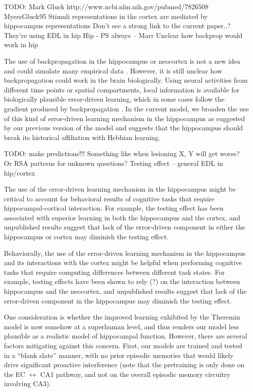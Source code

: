 \documentclass[11pt,twoside]{article}
\newif\myifpdf
\begin{document}
TODO: Mark Gluck  http://www.ncbi.nlm.nih.gov/pubmed/7826508  MyersGluck95
Stimuli representations in the cortex are mediated by hippocampus representations
Don't see a strong link to the current paper..?
They're using EDL in hip
Hip - PS always -- Marr
Unclear how backprop would work in hip

The use of backpropagation in the hippocampus or neocortex is not a new idea and could simulate many empirical data \citep{MyersGluck95}.  However, it is still unclear how backpropagation could work in the brain biologically.  Using neural activities from different time points or spatial compartments, local information is available for biologically plausible error-driven learning, which in some cases follow the gradient produced by backpropagation \citep{LillicrapSantoroMarrisEtAl20}.  In the current model, we broaden the use of this kind of error-driven learning mechanism in the hippocampus as suggested by our previous version of the model \citep{KetzMorkondaOReilly13} and suggests that the hippocampus should break its historical affiliation with Hebbian learning. 

TODO: make predictions!!!
Something like when lesioning X, Y will get worse?
Or RSA patterns for unknown questions?
Testing effect -- general EDL in hip/cortex

The use of the error-driven learning mechanism in the hippocampus might be critical to account for behavioral results of cognitive tasks that require hippocampal-cortical interaction. For example, the testing effect has been associated with superior learning in both the hippocampus and the cortex, and unpublished results suggest that lack of the error-driven component in either the hippocampus or cortex may diminish the testing effect.

Behaviorally, the use of the error-driven learning mechanism in the hippocampus and its interactions with the cortex might be helpful when performing cognitive tasks that require computing differences between different task states. For example, testing effects have been shown to rely (?) on the interaction between hippocampus and the neocortex, and unpublished results suggest that lack of the error-driven component in the hippocampus may diminish the testing effect.

One consideration is whether the improved learning exhibited by the Theremin model is now somehow at a superhuman level, and thus renders our model less plausible as a realistic model of hippocampal function.  However, there are several factors mitigating against this concern.  First, our models are trained and tested in a ``blank slate'' manner, with no prior episodic memories that would likely drive significant proactive interference (note that the pretraining is only done on the EC $\leftrightarrow$ CA1 pathway, and not on the overall episodic memory circuitry involving CA3).  
\end{document}
